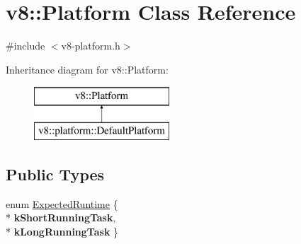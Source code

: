 \hypertarget{classv8_1_1_platform}{}\section{v8\+:\+:Platform Class Reference}
\label{classv8_1_1_platform}


{\ttfamily \#include $<$v8-\/platform.\+h$>$}

Inheritance diagram for v8\+:\+:Platform\+:\begin{figure}[H]
\begin{center}
\leavevmode
\includegraphics[height=2.000000cm]{classv8_1_1_platform}
\end{center}
\end{figure}
\subsection*{Public Types}
\begin{DoxyCompactItemize}
\item 
enum \hyperlink{classv8_1_1_platform_ace7f666b2b5995bb0e898e12fa660718}{Expected\+Runtime} \{ \\*
{\bfseries k\+Short\+Running\+Task}, 
\\*
{\bfseries k\+Long\+Running\+Task}
 \}
\end{DoxyCompactItemize}
